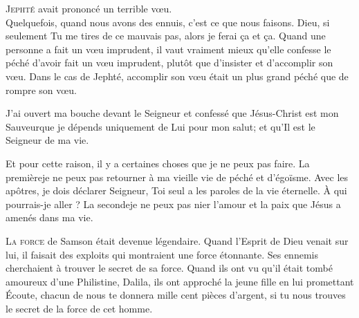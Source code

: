 \lettrine{J}{ephté} avait prononcé un terrible v\oe{}u. \\[1ex]
Quelquefois, quand nous avons des ennuis, c'est ce que nous faisons.
 \Og Dieu, si seulement Tu me tires de ce mauvais pas,
 alors je ferai \c{c}a et \c{c}a. \Fg{}
 Quand une personne a fait un v\oe{}u imprudent,
 il vaut vraiment mieux qu'elle confesse le péché d'avoir fait un v\oe{}u imprudent,
 plutôt que d'insister et d'accomplir son v\oe{}u.
 Dans le cas de Jephté, accomplir son v\oe{}u était un plus grand péché
 que de rompre son v\oe{}u.


J'ai ouvert ma bouche devant le Seigneur et confessé que Jésus-Christ
 est mon Sauveur\frcolon que je dépends uniquement de Lui pour mon salut;
 et qu'Il est le Seigneur de ma vie.

Et pour cette raison, il y a certaines choses que je ne peux pas faire.
 La première\frcolon je ne peux pas retourner à ma vieille vie de péché et d'égoïsme.
 Avec les apôtres, je dois déclarer\frcolon
 \Og Seigneur, Toi seul a les paroles de la vie éternelle.
 \`A qui pourrais-je aller ? \Fg{}
 La seconde\frcolon je ne peux pas nier l'amour et la paix que Jésus
 a amenés dans ma vie. 

\dvrule






\lettrine{L}{a force} de Samson était devenue légendaire.
 Quand l'Esprit de Dieu venait sur lui, il faisait des exploits
 qui montraient une force étonnante.
 Ses ennemis cherchaient à trouver le secret de sa force.
 Quand ils ont vu qu'il était tombé amoureux d'une Philistine, Dalila,
 ils ont approché la jeune fille en lui promettant\frcolon
 \Og Écoute, chacun de nous te donnera mille cent pièces d'argent,
 si tu nous trouves le secret de la force de cet homme. \Fg{}

